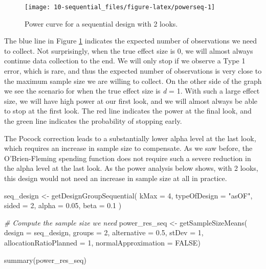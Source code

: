 \documentclass[
  oneside]{book}
\newenvironment{Shaded}{\begin{snugshade}}{\end{snugshade}}
\newcommand{\AttributeTok}[1]{\textcolor[rgb]{0.77,0.63,0.00}{#1}}
\newcommand{\CommentTok}[1]{\textcolor[rgb]{0.56,0.35,0.01}{\textit{#1}}}
\newcommand{\ConstantTok}[1]{\textcolor[rgb]{0.00,0.00,0.00}{#1}}
\newcommand{\DecValTok}[1]{\textcolor[rgb]{0.00,0.00,0.81}{#1}}
\newcommand{\FloatTok}[1]{\textcolor[rgb]{0.00,0.00,0.81}{#1}}
\newcommand{\FunctionTok}[1]{\textcolor[rgb]{0.00,0.00,0.00}{#1}}
\newcommand{\NormalTok}[1]{#1}
\newcommand{\OtherTok}[1]{\textcolor[rgb]{0.56,0.35,0.01}{#1}}
\newcommand{\StringTok}[1]{\textcolor[rgb]{0.31,0.60,0.02}{#1}}
\begin{document}
\begin{figure}

{\centering \texttt{[image: 10-sequential\_files/figure-latex/powerseq-1]} 

}

\caption{Power curve for a sequential design with 2 looks.}\label{fig:powerseq}
\end{figure}

The blue line in Figure \ref{fig:powerseq} indicates the expected number of observations we need to collect. Not surprisingly, when the true effect size is 0, we will almost always continue data collection to the end. We will only stop if we observe a Type 1 error, which is rare, and thus the expected number of observations is very close to the maximum sample size we are willing to collect. On the other side of the graph we see the scenario for when the true effect size is \emph{d} = 1. With such a large effect size, we will have high power at our first look, and we will almost always be able to stop at the first look. The red line indicates the power at the final look, and the green line indicates the probability of stopping early.

The Pocock correction leads to a substantially lower alpha level at the last look, which requires an increase in sample size to compensate. As we saw before, the O'Brien-Fleming spending function does not require such a severe reduction in the alpha level at the last look. As the power analysis below shows, with 2 looks, this design would not need an increase in sample size at all in practice.

\begin{Shaded}
\begin{Highlighting}[]
\NormalTok{seq\_design }\OtherTok{\textless{}{-}} \FunctionTok{getDesignGroupSequential}\NormalTok{(}
  \AttributeTok{kMax =} \DecValTok{4}\NormalTok{,}
  \AttributeTok{typeOfDesign =} \StringTok{"asOF"}\NormalTok{,}
  \AttributeTok{sided =} \DecValTok{2}\NormalTok{,}
  \AttributeTok{alpha =} \FloatTok{0.05}\NormalTok{,}
  \AttributeTok{beta =} \FloatTok{0.1}
\NormalTok{  )}

\CommentTok{\# Compute the sample size we need}
\NormalTok{power\_res\_seq }\OtherTok{\textless{}{-}} \FunctionTok{getSampleSizeMeans}\NormalTok{(}
  \AttributeTok{design =}\NormalTok{ seq\_design,}
  \AttributeTok{groups =} \DecValTok{2}\NormalTok{,}
  \AttributeTok{alternative =} \FloatTok{0.5}\NormalTok{, }
  \AttributeTok{stDev =} \DecValTok{1}\NormalTok{, }
  \AttributeTok{allocationRatioPlanned =} \DecValTok{1}\NormalTok{,}
  \AttributeTok{normalApproximation =} \ConstantTok{FALSE}\NormalTok{)}

\FunctionTok{summary}\NormalTok{(power\_res\_seq)}
\end{Highlighting}
\end{Shaded}
\end{document}
